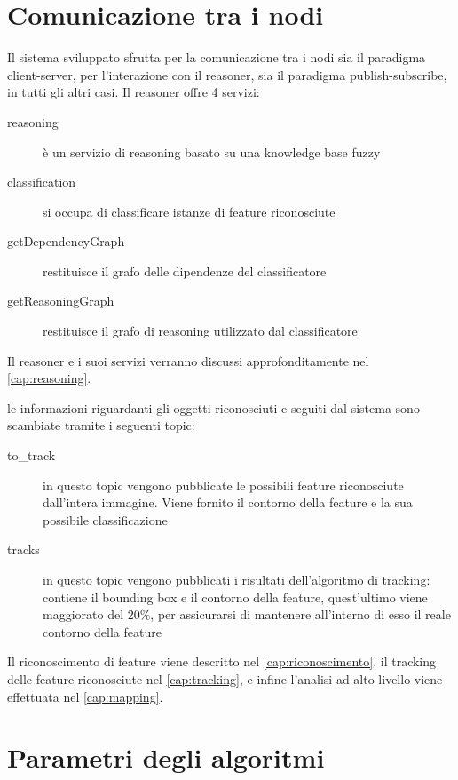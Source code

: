 \section{Comunicazione tra i nodi}

Il sistema sviluppato sfrutta per la comunicazione tra i nodi sia il paradigma client-server, per l'interazione con il reasoner, sia il paradigma publish-subscribe, in tutti gli altri casi.
Il reasoner offre 4 servizi:

\begin{description}
 \item [\/reasoning] è un  servizio di reasoning basato su una knowledge base fuzzy
 \item [\/classification] si occupa di classificare istanze di feature riconosciute
 \item [\/getDependencyGraph] restituisce il grafo delle dipendenze del classificatore
 \item [\/getReasoningGraph] restituisce il grafo di reasoning utilizzato dal classificatore
\end{description}

Il reasoner e i suoi servizi verranno discussi approfonditamente  nel \autoref{cap:reasoning}.

le informazioni riguardanti gli oggetti riconosciuti e seguiti dal sistema sono scambiate tramite i seguenti topic:

\begin{description}
 \item [\/to\_track] in questo topic vengono pubblicate le possibili feature riconosciute dall'intera immagine. Viene fornito il contorno della feature e la sua possibile classificazione
 \item [\/tracks] in questo topic vengono pubblicati i risultati dell'algoritmo di tracking: contiene il bounding box e il contorno della feature, quest'ultimo viene maggiorato del 20\%, per assicurarsi di mantenere all'interno di esso il reale contorno della feature
\end{description}

Il riconoscimento di feature viene descritto nel \autoref{cap:riconoscimento}, il tracking delle feature riconosciute nel \autoref{cap:tracking}, e infine l'analisi ad alto livello viene effettuata nel \autoref{cap:mapping}.


\section{Parametri degli algoritmi}

